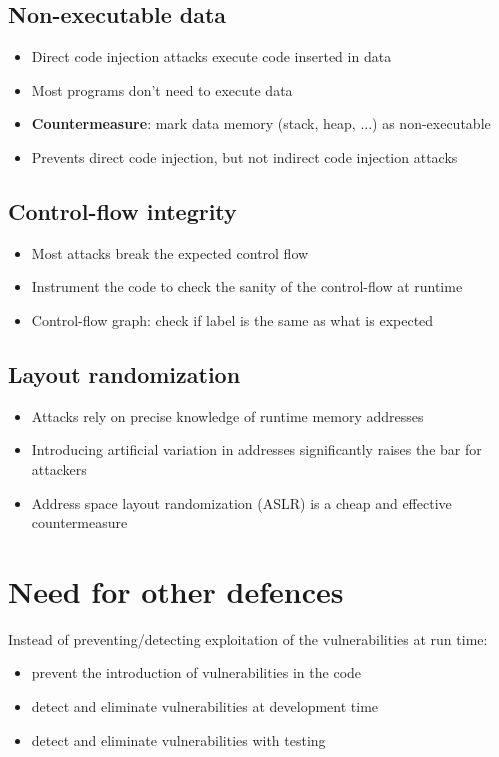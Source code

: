 \documentclass[12pt,titlepage,a4paper]{report}
\begin{document}
	\subsection{Non-executable data}
	\begin{itemize}
		\item Direct code injection attacks execute code inserted in data
		\item Most programs don't need to execute data
		\item \textbf{Countermeasure}: mark data memory (stack, heap, ...) as non-executable
		\item Prevents direct code injection, but not indirect code injection attacks
	\end{itemize}
	
	\subsection{Control-flow integrity}
	\begin{itemize}
		\item Most attacks break the expected control flow
		\item Instrument the code to check the sanity of the control-flow at runtime
		\item Control-flow graph: check if label is the same as what is expected
	\end{itemize}
	
	\subsection{Layout randomization}
	\begin{itemize}
		\item Attacks rely on precise knowledge of runtime memory addresses
		\item Introducing artificial variation in addresses significantly raises the bar for attackers
		\item Address space layout randomization (ASLR) is a cheap and effective countermeasure
	\end{itemize}

	
	\section{Need for other defences}
	Instead of preventing/detecting exploitation of the vulnerabilities at run time:
	\begin{itemize}
		\item prevent the introduction of vulnerabilities in the code
		\item detect and eliminate vulnerabilities at development time
		\item detect and eliminate vulnerabilities with testing
	\end{itemize}
\end{document}
